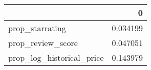 \begin{tabular}{lr}
\toprule
 & 0 \\
\midrule
prop_starrating & 0.034199 \\
prop_review_score & 0.047051 \\
prop_log_historical_price & 0.143979 \\
\bottomrule
\end{tabular}
